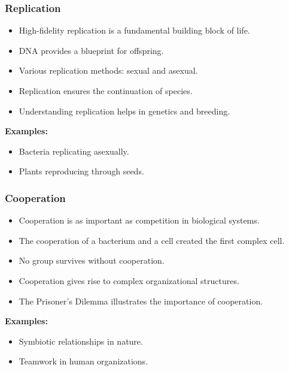 \begin{frame}[fragile]\frametitle{Replication}
\begin{itemize}
    \item High-fidelity replication is a fundamental building block of life.
    \item DNA provides a blueprint for offspring.
    \item Various replication methods: sexual and asexual.
    \item Replication ensures the continuation of species.
    \item Understanding replication helps in genetics and breeding.
\end{itemize}
\textbf{Examples:}
\begin{itemize}
    \item Bacteria replicating asexually.
    \item Plants reproducing through seeds.
\end{itemize}
\end{frame}

\begin{frame}[fragile]\frametitle{Cooperation}
\begin{itemize}
    \item Cooperation is as important as competition in biological systems.
    \item The cooperation of a bacterium and a cell created the first complex cell.
    \item No group survives without cooperation.
    \item Cooperation gives rise to complex organizational structures.
    \item The Prisoner’s Dilemma illustrates the importance of cooperation.
\end{itemize}
\textbf{Examples:}
\begin{itemize}
    \item Symbiotic relationships in nature.
    \item Teamwork in human organizations.
\end{itemize}
\end{frame}

